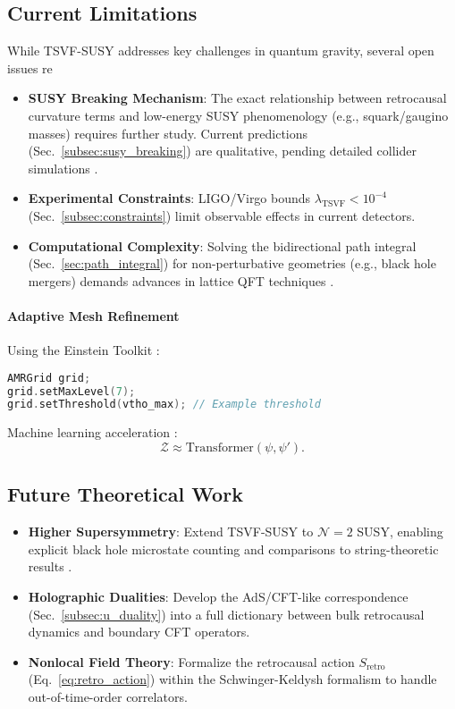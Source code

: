 \documentclass[twocolumn,superscriptaddress,floatfix]{revtex4-2}
\begin{document}
\subsection{Current Limitations}  
\label{subsec:limitations}  

While TSVF-SUSY addresses key challenges in quantum gravity, several open issues re  
\begin{itemize}  
\item \textbf{SUSY Breaking Mechanism}: The exact relationship between retrocausal curvature terms and low-energy SUSY phenomenology (e.g., squark/gaugino masses) requires further study. Current predictions (Sec.~\ref{subsec:susy_breaking}) are qualitative, pending detailed collider simulations \cite{Allanach2021}.  
\item \textbf{Experimental Constraints}: LIGO/Virgo bounds \(\lambda_{\text{TSVF}} < 10^{-4}\) (Sec.~\ref{subsec:constraints}) limit observable effects in current detectors.  
\item \textbf{Computational Complexity}: Solving the bidirectional path integral (Sec.~\ref{sec:path_integral}) for non-perturbative geometries (e.g., black hole mergers) demands advances in lattice QFT techniques \cite{Lehner2019}.  
\end{itemize}  

\paragraph{Adaptive Mesh Refinement}
Using the Einstein Toolkit \cite{EinsteinToolkit2023}:
\begin{lstlisting}[language=C++, basicstyle=\small\ttfamily]
AMRGrid grid;
grid.setMaxLevel(7);
grid.setThreshold(vtho_max); // Example threshold
\end{lstlisting}

Machine learning acceleration \cite{George2023}:
\begin{equation}
\mathcal{Z} \approx \text{Transformer}(\psi, \psi').
\end{equation}

\subsection{Future Theoretical Work}  
\label{subsec:future_theory}  

\begin{itemize}  
\item \textbf{Higher Supersymmetry}: Extend TSVF-SUSY to \(\mathcal{N}=2\) SUSY, enabling explicit black hole microstate counting \cite{Strominger1996} and comparisons to string-theoretic results \cite{Sen2008}.  
\item \textbf{Holographic Dualities}: Develop the AdS/CFT-like correspondence (Sec.~\ref{subsec:u_duality}) into a full dictionary between bulk retrocausal dynamics and boundary CFT operators.  
\item \textbf{Nonlocal Field Theory}: Formalize the retrocausal action \(S_{\text{retro}}\) (Eq.~\ref{eq:retro_action}) within the Schwinger-Keldysh formalism \cite{Haehl2017} to handle out-of-time-order correlators.  
\end{itemize}  
\end{document}
